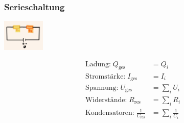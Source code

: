     \subsubsection{Serieschaltung}
        \vspace{-1mm}
        \begin{minipage}{0.39\linewidth}
            \begin{footnotesize}
                \begin{center}
                    \vspace{2mm}
                    \includegraphics[width = 20mm]{src/images/serieschaltung.png}
                \end{center}
            \end{footnotesize}
        \end{minipage}
        \begin{minipage}{0.6\linewidth}
            \begin{scriptsize}
                \begin{center}
                    \begin{align*}
                        \text{Ladung:} \; Q_{\text{ges}} &= Q_i\\
                        \text{Stromstärke:} \; I_{\text{ges}} &= I_i\\
                        \text{Spannung:} \; U_{\text{ges}} &= \sum\limits_i U_i\\
                        \text{Widerstände:} \; R_{\text{res}} &= \sum\limits_i R_i\\
                        \text{Kondensatoren:} \; \frac{1}{C_{\text{res}}} &= \sum\limits_i \frac{1}{C_i}
                    \end{align*}
                \end{center}
            \end{scriptsize}
        \end{minipage}
        \vspace{1mm}

